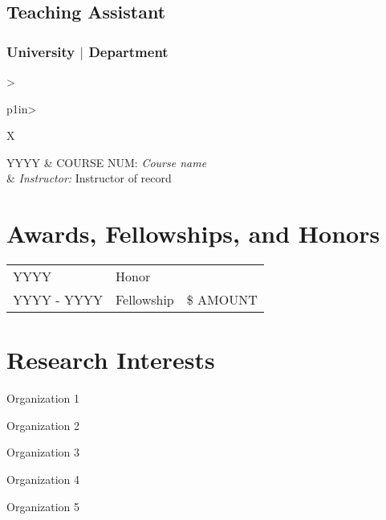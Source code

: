 \documentclass[11pt]{article}
\newcommand{\RR}{\raggedright\arraybackslash} %
\newcommand{\RL}{\raggedleft\arraybackslash}  %
\begin{document}
\subsection*{Teaching Assistant}
\subsubsection*{University $\mid$ Department}
\begin{tabularx}{\linewidth}{>{\RR}p{1in}>{\RR}X}
YYYY & COURSE NUM: \textit{Course name} \\
&\hspace{1em}	\textit{Instructor:} Instructor of record  \\
\end{tabularx}



\section*{Awards, Fellowships, and Honors}
\begin{tabularx}{\linewidth}{>{\RR}p{1in}>{\RR}X>{\RL}p{.85in}}
YYYY & Honor \\
YYYY - YYYY & Fellowship & \$ AMOUNT \\ %

\end{tabularx}



\section*{Research Interests}

\hspace{-.25em}\begin{itemize*}[itemjoin={{ $\bullet$}}, label={}]
\item Organization 1
\item Organization 2
\item Organization 3
\item Organization 4
\item Organization 5
\end{itemize*}

\end{document}

